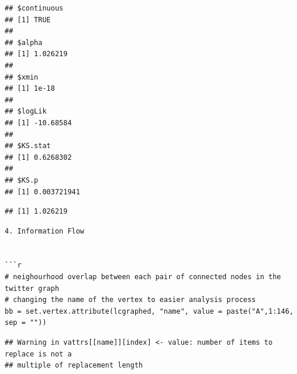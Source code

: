 \documentclass[
]{article}
\begin{document}
\begin{verbatim}
## $continuous
## [1] TRUE
## 
## $alpha
## [1] 1.026219
## 
## $xmin
## [1] 1e-18
## 
## $logLik
## [1] -10.68584
## 
## $KS.stat
## [1] 0.6268302
## 
## $KS.p
## [1] 0.003721941
\end{verbatim}

\begin{verbatim}
## [1] 1.026219
\end{verbatim}

\begin{verbatim}
4. Information Flow


```r
# neighourhood overlap between each pair of connected nodes in the twitter graph 
# changing the name of the vertex to easier analysis process
bb = set.vertex.attribute(lcgraphed, "name", value = paste("A",1:146, sep = ""))
\end{verbatim}

\begin{verbatim}
## Warning in vattrs[[name]][index] <- value: number of items to replace is not a
## multiple of replacement length
\end{verbatim}
\end{document}
